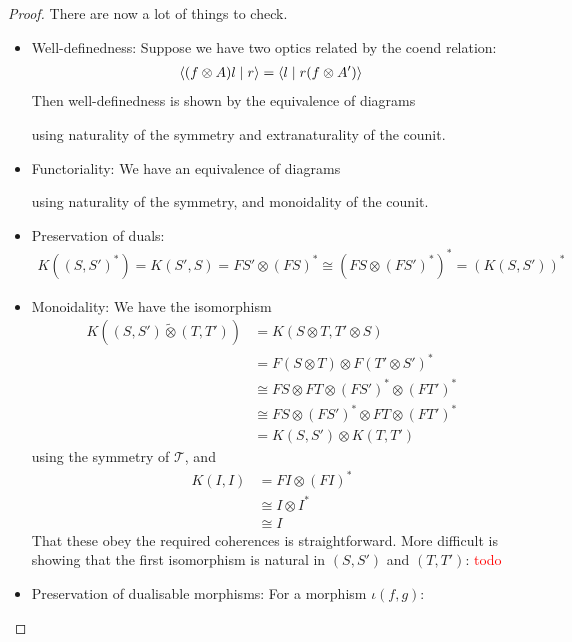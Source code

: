 \documentclass[11pt,a4paper]{article}
\theoremstyle{plain}
\theoremstyle{definition}
\newcommand{\T}{\mathscr{T}}
\newcommand{\switched}{\mathbin{\tilde{\otimes}}}
\newcommand{\rep}[2]{{\ensuremath \left\langle #1 \mid #2 \right\rangle}}
\newcommand{\todo}[1]{\textcolor{red}{\small #1}}
\begin{document}
\begin{proof}
There are now a lot of things to check. 
\begin{itemize}
\item Well-definedness: Suppose we have two optics related by the coend relation:
  \begin{align*}
    \rep{(f \otimes A) l}{r} = \rep{l}{r (f \otimes A')}
  \end{align*}
  Then well-definedness is shown by the equivalence of diagrams
  \begin{center}
    
    \qquad \raisebox{1.5cm}{$=$} \qquad
    
  \end{center}
  using naturality of the symmetry and extranaturality of the counit.
\item Functoriality: We have an equivalence of diagrams
  \begin{center}
    
    \quad \raisebox{1.5cm}{$=$} \quad
    
  \end{center}
using naturality of the symmetry, and monoidality of the counit.
\item Preservation of duals:
\begin{align*}
K((S, S')^*) 
= K(S', S) 
= FS' \otimes (FS)^*
\cong (FS \otimes (FS')^*)^*
= (K(S, S'))^*
\end{align*}
\item Monoidality: We have the isomorphism
\begin{align*}
K((S, S') \switched (T, T')) 
&= K(S \otimes T, T' \otimes S) \\
&= F(S \otimes T) \otimes F(T' \otimes S')^* \\
&\cong FS \otimes FT \otimes (FS')^* \otimes (FT')^* \\
&\cong FS \otimes (FS')^* \otimes FT \otimes (FT')^* \\
&= K(S, S') \otimes K(T, T')
\end{align*}
using the symmetry of $\T$, and
\begin{align*}
K(I, I) 
&= FI \otimes (FI)^* \\
&\cong I \otimes I^* \\
&\cong I
\end{align*}
That these obey the required coherences is straightforward. More difficult is showing that the first isomorphism is natural in $(S, S')$ and $(T, T')$: \todo{todo}
\item Preservation of dualisable morphisms:  For a morphism $\iota(f, g)$:

\end{itemize}
\end{proof}
\end{document}
